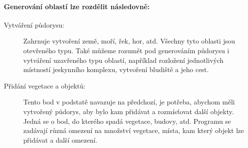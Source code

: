\paragraph*{Generování oblastí lze rozdělit následovně:}
\begin{description}
	\item[Vytváření půdorysu:] Zahrnuje vytvoření země, moří, řek, hor, atd. Všechny tyto oblasti jsou otevřeného typu. Také můžeme rozumět pod generováním půdorysu i vytváření uzavřeného typu oblastí, například rozložení jednotlivých místností jeskynního komplexu, vytvoření bludiště a jeho cest. 
	
	\item[Přidání vegetace a objektů:] Tento bod v podstatě navazuje na předchozí, je potřeba, abychom měli vytvořený půdorys, aby bylo kam přidávat a rozmísťovat další objekty. Jedná se o bod, do kterého spadá vegetace, budovy, atd. Programu se zadávají různá omezení na množství vegetace, místa, kam který objekt lze přidávat a další omezení.
\end{description} 

